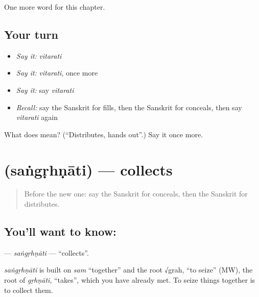 \begin{grammarlens}[title={What you've built}]
One more word for this chapter.
\end{grammarlens}

\subsection*{Your turn}
\begin{itemize}
\raggedright
  \item \emph{Say it:} \emph{vitarati}
  \item \emph{Say it:} \emph{vitarati}, once more
  \item \emph{Say it:} say \emph{vitarati}
  \item \emph{Recall:} say the Sanskrit for fills, then the Sanskrit for conceals, then say \emph{vitarati} again
\end{itemize}

\begin{tcolorbox}[breakable,colback=teal!4,colframe=teal!35!black,title={Before you move on}]
What does  mean? (\textquotedblleft{}Distributes, hands out\textquotedblright{}.) Say it once more.
\end{tcolorbox}
\section[\texorpdfstring{\sk{संगृह्णाति} (saṅgṛhṇāti)}{संगृह्णाति (saṅgṛhṇāti)}]{ (saṅgṛhṇāti) — collects}

\label{lesson:SA-C177-sangrhnati}



\begin{quote}
Before the new one: say the Sanskrit for conceals, then the Sanskrit for distributes.
\end{quote}

\subsection*{You'll want to know: }
\textbf{} — \emph{saṅgṛhṇāti} — \textquotedblleft{}collects\textquotedblright{}.

\begin{cousinweb}
\emph{saṅgṛhṇāti} is built on \emph{sam} \textquotedblleft{}together\textquotedblright{} and the root √grah, \textquotedblleft{}to seize\textquotedblright{} (MW), the root of \emph{gṛhṇāti}, \textquotedblleft{}takes\textquotedblright{}, which you have already met. To seize things together is to collect them.
\end{cousinweb}

